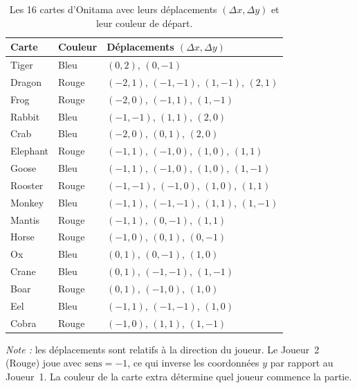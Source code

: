 \documentclass[12pt, a4paper]{article}
\begin{document}
\begin{table}[H]
  \centering
  \caption{Les 16 cartes d'Onitama avec leurs déplacements $(\Delta x, \Delta y)$ et leur couleur de départ.}
  \label{tab:cartes}
  \begin{tabular}{llp{7.5cm}}
    \toprule
    \textbf{Carte} & \textbf{Couleur} & \textbf{Déplacements $(\Delta x, \Delta y)$} \\
    \midrule
    Tiger   & Bleu  & $(0,2)$, $(0,-1)$ \\
    Dragon  & Rouge & $(-2,1)$, $(-1,-1)$, $(1,-1)$, $(2,1)$ \\
    Frog    & Rouge & $(-2,0)$, $(-1,1)$, $(1,-1)$ \\
    Rabbit  & Bleu  & $(-1,-1)$, $(1,1)$, $(2,0)$ \\
    Crab    & Bleu  & $(-2,0)$, $(0,1)$, $(2,0)$ \\
    Elephant & Rouge & $(-1,1)$, $(-1,0)$, $(1,0)$, $(1,1)$ \\
    Goose   & Bleu  & $(-1,1)$, $(-1,0)$, $(1,0)$, $(1,-1)$ \\
    Rooster & Rouge & $(-1,-1)$, $(-1,0)$, $(1,0)$, $(1,1)$ \\
    Monkey  & Bleu  & $(-1,1)$, $(-1,-1)$, $(1,1)$, $(1,-1)$ \\
    Mantis  & Rouge & $(-1,1)$, $(0,-1)$, $(1,1)$ \\
    Horse   & Rouge & $(-1,0)$, $(0,1)$, $(0,-1)$ \\
    Ox      & Bleu  & $(0,1)$, $(0,-1)$, $(1,0)$ \\
    Crane   & Bleu  & $(0,1)$, $(-1,-1)$, $(1,-1)$ \\
    Boar    & Rouge & $(0,1)$, $(-1,0)$, $(1,0)$ \\
    Eel     & Bleu  & $(-1,1)$, $(-1,-1)$, $(1,0)$ \\
    Cobra   & Rouge & $(-1,0)$, $(1,1)$, $(1,-1)$ \\
    \bottomrule
  \end{tabular}
\end{table}

\noindent\textit{Note :} les déplacements sont relatifs à la direction du joueur. Le Joueur~2
(Rouge) joue avec $\text{sens} = -1$, ce qui inverse les coordonnées $y$ par rapport au
Joueur~1. La couleur de la carte extra détermine quel joueur commence la partie.
\end{document}
